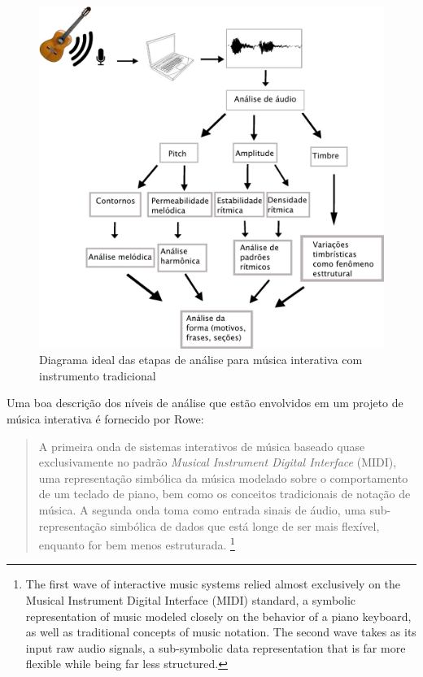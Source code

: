 \documentclass[draft]{ppgmus}
\begin{document}
\begin{figure}
\includegraphics[scale=.9]{analise}
\caption{Diagrama ideal das etapas de análise para música interativa com instrumento tradicional}
\label{analise-geral}
\end{figure} 

Uma boa descrição dos níveis de análise que estão envolvidos em um projeto
de música interativa é fornecido por Rowe:

\begin{quote}
A primeira onda de sistemas interativos de música baseado quase exclusivamente no padrão \textit{Musical
Instrument Digital Interface} (MIDI), uma representação simbólica da música modelado
sobre o comportamento de um teclado de piano, bem como os conceitos tradicionais de notação de música.
A segunda onda toma como entrada sinais de áudio, uma sub-representação simbólica de dados que está longe
de ser mais flexível, enquanto for bem menos estruturada. \cite{rowe09:levels}
\footnote{The first wave of interactive music systems relied almost exclusively on the Musical 
Instrument Digital Interface (MIDI) standard, a symbolic representation of music modeled 
closely on the behavior of a piano keyboard, as well as traditional concepts of music notation. 
The second wave takes as its input raw audio signals, a sub-symbolic data representation that is far 
more flexible while being far less structured.}
\end{quote}
\end{document}
